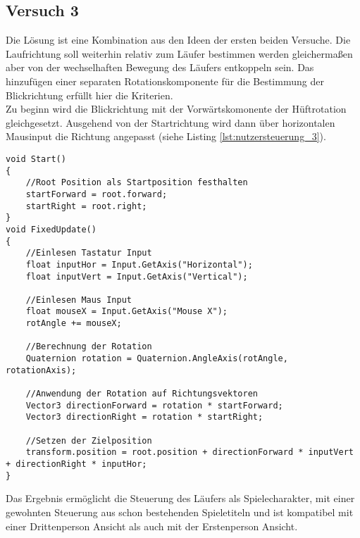 \subsection{Versuch 3}
Die Lösung ist eine Kombination aus den Ideen der ersten beiden Versuche. Die Laufrichtung soll weiterhin relativ zum Läufer bestimmen werden gleichermaßen aber von der wechselhaften Bewegung des Läufers entkoppeln sein.
Das hinzufügen einer separaten Rotationskomponente für die Bestimmung der Blickrichtung erfüllt hier die Kriterien. \\
Zu beginn wird die Blickrichtung mit der Vorwärtskomonente der Hüftrotation gleichgesetzt. Ausgehend von der Startrichtung wird dann über horizontalen Mausinput die Richtung angepasst (siehe Listing \ref{lst:nutzersteuerung_3}).
\begin{lstlisting}[caption={Erweiterung der Nutzersteuerung mit separater Blickrichtung},captionpos=b,label={lst:nutzersteuerung_3}]
void Start()
{
    //Root Position als Startposition festhalten
    startForward = root.forward;
    startRight = root.right;
}
void FixedUpdate()
{
    //Einlesen Tastatur Input
    float inputHor = Input.GetAxis("Horizontal");
    float inputVert = Input.GetAxis("Vertical");

    //Einlesen Maus Input
    float mouseX = Input.GetAxis("Mouse X");
    rotAngle += mouseX;

    //Berechnung der Rotation
    Quaternion rotation = Quaternion.AngleAxis(rotAngle, rotationAxis);

    //Anwendung der Rotation auf Richtungsvektoren
    Vector3 directionForward = rotation * startForward;
    Vector3 directionRight = rotation * startRight;

    //Setzen der Zielposition
    transform.position = root.position + directionForward * inputVert + directionRight * inputHor;
}
\end{lstlisting}
Das Ergebnis ermöglicht die Steuerung des Läufers als Spielecharakter, mit einer gewohnten Steuerung aus schon bestehenden Spieletiteln und ist kompatibel mit einer Drittenperson Ansicht als auch mit der Erstenperson Ansicht.